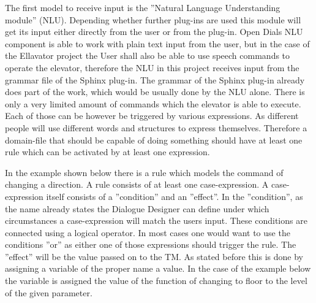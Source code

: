 \documentclass[a4paper, 12pt]{article}
\begin{document}
The first model to receive input is the ”Natural Language Understanding module” (NLU). 
Depending whether further plug-ins are used this module will get its input either directly from the user or from the plug-in.
Open Dials NLU component is able to work with plain text input from the user, but in the case of the Ellavator project the User shall also be able to use speech commands to operate the elevator, therefore the NLU in this project receives input from the grammar file of the Sphinx plug-in.
The grammar of the Sphinx plug-in already does part of the work, which would be usually done by the NLU alone.
There is only a very limited amount of commands which the elevator is able to execute.
Each of those can be however be triggered by various expressions. As different people will use different words and structures to express themselves.
Therefore a domain-file that should be capable of doing something should have at least one rule which can be activated by at least one expression. \newline

In the example shown below there is a rule which models the command of changing a direction.
A rule consists of at least one case-expression.
A case-expression itself consists of a ”condition” and an ”effect”.
 In the ”condition”, as the name already states the Dialogue Designer can define under which circumstances a case-expression will match the users input.
These conditions are connected using a logical operator.
In most cases one would want to use the conditions ”or” as either one of those expressions should trigger the rule.
 The ”effect” will be the value passed on to the TM.
As stated before this is done by assigning a variable of the proper name a value.
In the case of the example below the variable is assigned the value of the function of changing to floor to the level of the given parameter. 
\newline
\end{document}
